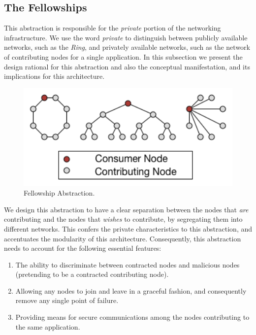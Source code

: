 \documentclass[12pt, titlepage]{uo_temp}
\begin{document}
     \subsection{The Fellowships}
     This abstraction is responsible for the \emph{private} portion of the networking
     infrastructure. We use the word \emph{private} to distinguish between publicly
     available networks, such as the \emph{Ring}, and privately available networks, such
     as the network of contributing nodes for a single application. In this subsection we
     present the design rational for this abstraction and also the conceptual
     manifestation, and its implications for this architecture.

     \begin{figure}
       \centering
       \includegraphics[width=125mm]{images/arch_fellowship.png}
       \caption{Fellowship Abstraction.}
     \end{figure}

     We design this abstraction to have a clear separation between the nodes that
     \emph{are} contributing and the nodes that \emph{wishes} to contribute, by
     segregating them into different networks. This confers the private characteristics to
     this abstraction, and accentuates the modularity of this architecture. Consequently,
     this abstraction needs to account for the following essential features:

     \begin{enumerate}
       \item The ability to discriminate between contracted nodes and malicious nodes
         (pretending to be a contracted contributing node).
       \item Allowing any nodes to join and leave in a graceful fashion, and consequently
         remove any single point of failure.
       \item Providing means for secure communications among the nodes contributing to the
         same application.
     \end{enumerate}
\end{document}
